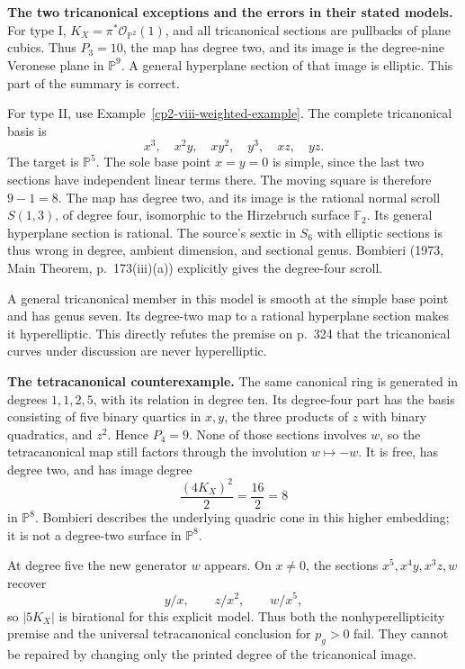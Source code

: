 \textbf{The two tricanonical exceptions and the errors in their stated models.}
For type I, \(K_X=\pi^*\mathcal O_{\mathbb P^2}(1)\), and all tricanonical sections are pullbacks of plane cubics. Thus \(P_3=10\), the map has degree two, and its image is the degree-nine Veronese plane in \(\mathbb P^9\). A general hyperplane section of that image is elliptic. This part of the summary is correct.

For type II, use Example~\ref{cp2-viii-weighted-example}. The complete tricanonical basis is
\[
x^3,\quad x^2y,\quad xy^2,\quad y^3,\quad xz,\quad yz.
\]
The target is \(\mathbb P^5\). The sole base point \(x=y=0\) is simple, since the last two sections have independent linear terms there. The moving square is therefore \(9-1=8\). The map has degree two, and its image is the rational normal scroll \(S(1,3)\), of degree four, isomorphic to the Hirzebruch surface \(\mathbb F_2\). Its general hyperplane section is rational. The source's sextic in \(S_6\) with elliptic sections is thus wrong in degree, ambient dimension, and sectional genus. Bombieri (1973, Main Theorem, p.~173(iii)(a)) explicitly gives the degree-four scroll.

A general tricanonical member in this model is smooth at the simple base point and has genus seven. Its degree-two map to a rational hyperplane section makes it hyperelliptic. This directly refutes the premise on p.~324 that the tricanonical curves under discussion are never hyperelliptic.

\textbf{The tetracanonical counterexample.}
The same canonical ring is generated in degrees \(1,1,2,5\), with its relation in degree ten. Its degree-four part has the basis consisting of five binary quartics in \(x,y\), the three products of \(z\) with binary quadratics, and \(z^2\). Hence \(P_4=9\). None of those sections involves \(w\), so the tetracanonical map still factors through the involution \(w\mapsto-w\). It is free, has degree two, and has image degree
\[
\frac{(4K_X)^2}{2}=\frac{16}{2}=8
\]
in \(\mathbb P^8\). Bombieri describes the underlying quadric cone in this higher embedding; it is not a degree-two surface in \(\mathbb P^8\).

At degree five the new generator \(w\) appears. On \(x\ne0\), the sections \(x^5,x^4y,x^3z,w\) recover
\[
y/x,\qquad z/x^2,\qquad w/x^5,
\]
so \(|5K_X|\) is birational for this explicit model. Thus both the nonhyperellipticity premise and the universal tetracanonical conclusion for \(p_g>0\) fail. They cannot be repaired by changing only the printed degree of the tricanonical image.

